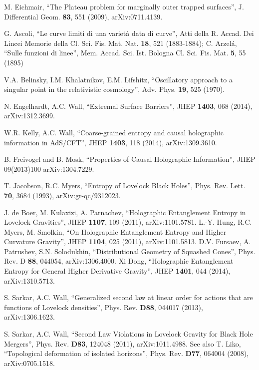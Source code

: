 \documentclass{article}
\begin{document}
\begin{thebibliography}{99}
M. Eichmair, ``The Plateau problem for marginally outer trapped surfaces'', J. Differential Geom. \textbf{83}, 551 (2009), arXiv:0711.4139.


G. Ascoli, ``Le curve limiti di una variet\`{a} data di curve'', Atti della R. Accad. Dei Lincei Memorie della Cl. Sci. Fis. Mat. Nat. \textbf{18}, 521 (1883-1884); C. Arzel\'{a}, ``Sulle funzioni di linee'', Mem. Accad. Sci. Ist. Bologna Cl. Sci. Fis. Mat. \textbf{5}, 55 (1895)

V.A. Belinsky, I.M. Khalatnikov, E.M. Lifshitz, ``Oscillatory approach to a singular point in the relativistic cosmology'', Adv. Phys. \textbf{19}, 525 (1970).

N. Engelhardt, A.C. Wall, ``Extremal Surface Barriers'', JHEP \textbf{1403}, 068 (2014), arXiv:1312.3699.

W.R. Kelly, A.C. Wall, ``Coarse-grained entropy and causal holographic information in AdS/CFT'', JHEP \textbf{1403}, 118 (2014), arXiv:1309.3610.

B. Freivogel and B. Mosk, ``Properties of Causal Holographic Information'', JHEP 09(2013)100 arXiv:1304.7229.

T. Jacobson, R.C. Myers, ``Entropy of Lovelock Black Holes'', Phys. Rev. Lett.  \textbf{70}, 3684 (1993), arXiv:gr-qc/9312023.

J. de Boer, M. Kulaxizi, A. Parnachev, ``Holographic Entanglement Entropy in Lovelock Gravities'', JHEP \textbf{1107}, 109 (2011), arXiv:1101.5781.
L.-Y. Hung, R.C. Myers, M. Smolkin, ``On Holographic Entanglement Entropy and Higher Curvature Gravity'', JHEP \textbf{1104}, 025 (2011), arXiv:1101.5813.
D.V. Fursaev, A. Patrushev, S.N. Solodukhin, ``Distributional Geometry of Squashed Cones'', Phys. Rev. D \textbf{88}, 044054, arXiv:1306.4000.
Xi Dong, ``Holographic Entanglement Entropy for General Higher Derivative Gravity'', JHEP \textbf{1401}, 044 (2014), arXiv:1310.5713.

S. Sarkar, A.C. Wall, ``Generalized second law at linear order for actions that are functions of Lovelock densities'', Phys. Rev. \textbf{D88}, 044017 (2013), arXiv:1306.1623.

S. Sarkar, A.C. Wall, ``Second Law Violations in Lovelock Gravity for Black Hole Mergers'', Phys. Rev. \textbf{D83}, 124048 (2011), arXiv:1011.4988.  See also T. Liko, ``Topological deformation of isolated horizons'', Phys. Rev. \textbf{D77}, 064004 (2008), arXiv:0705.1518.


\end{thebibliography}
\end{document}
